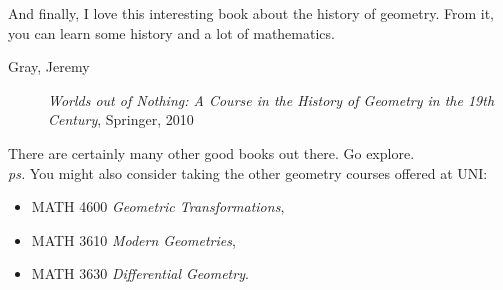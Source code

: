 \documentclass{tufte-handout}
\theoremstyle{definition}
\begin{document}
And finally, I love this interesting book about the history of geometry. From it, you can learn some history and a lot of mathematics.

\begin{description}
\item[Gray, Jeremy] \emph{Worlds out of Nothing: A Course in the History of Geometry in the 19th Century}, Springer, 2010
\end{description}

There are certainly many other good books out there. Go explore.\\

\noindent\textit{ps.} You might also consider taking the other geometry courses offered at UNI: 
\begin{itemize}
\item MATH 4600 \emph{Geometric Transformations}, 
\item MATH 3610 \emph{Modern Geometries},
\item MATH 3630 \emph{Differential Geometry}.
\end{itemize}
\end{document}
